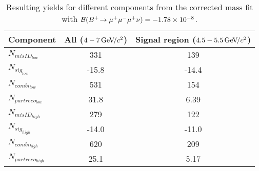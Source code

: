 \begin{table}[H]
\begin{center}
\begin{tabular}{| l | c | c |}
\hline
Component &  All ($4-7 {\mathrm{\,Ge\kern -0.1em V\!/}c^2}$) & Signal region ($4.5-5.5{\mathrm{\,Ge\kern -0.1em V\!/}c^2}$)  \\
\hline
$N_{misID_{low}}$  &  331 & 139 \\
$N_{sig_{low}}$  & -15.8  & -14.4 \\
$N_{combi_{low}}$  & 531 & 154 \\
$N_{partreco_{low}}$  & 31.8 & 6.39 \\
\hline
$N_{misID_{high}}$  &  279 & 122 \\
$N_{sig_{high}}$  &-14.0 & -11.0  \\
$N_{combi_{high}}$  & 620 & 209 \\
$N_{partreco_{high}}$ & 25.1 & 5.17 \\
\hline
\end{tabular}
\end{center}
\caption{Resulting yields for different components from the corrected mass fit with $\mathcal{B}({{{B}^+}}\!\rightarrow {\ensuremath{\mu^+\mu^-\mu^+}}\nu) =-1.78\times 10^{-8}$.}
\label{tab:yieldiatkos}
\end{table}


